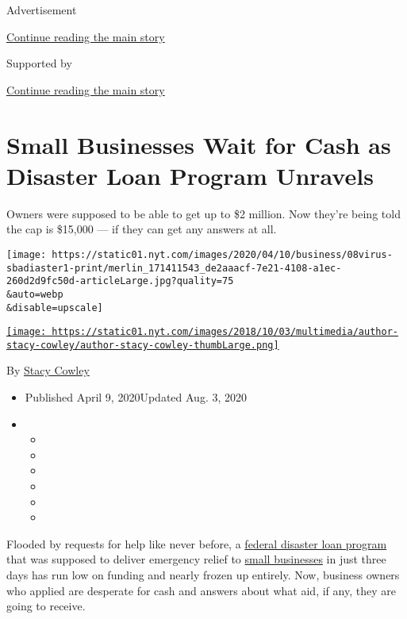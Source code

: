 Advertisement

\protect\hyperlink{after-top}{Continue reading the main story}

Supported by

\protect\hyperlink{after-sponsor}{Continue reading the main story}

\hypertarget{small-businesses-wait-for-cash-as-disaster-loan-program-unravels}{%
\section{Small Businesses Wait for Cash as Disaster Loan Program
Unravels}\label{small-businesses-wait-for-cash-as-disaster-loan-program-unravels}}

Owners were supposed to be able to get up to \$2 million. Now they're
being told the cap is \$15,000 --- if they can get any answers at all.

\texttt{[image: https://static01.nyt.com/images/2020/04/10/business/08virus-sbadiaster1-print/merlin\_171411543\_de2aaacf-7e21-4108-a1ec-260d2d9fc50d-articleLarge.jpg?quality=75\\\&auto=webp\\\&disable=upscale]}

\href{https://www.nytimes.com/by/stacy-cowley}{\texttt{[image: https://static01.nyt.com/images/2018/10/03/multimedia/author-stacy-cowley/author-stacy-cowley-thumbLarge.png]}}

By \href{https://www.nytimes.com/by/stacy-cowley}{Stacy Cowley}

\begin{itemize}
\item
  Published April 9, 2020Updated Aug. 3, 2020
\item
  \begin{itemize}
  \item
  \item
  \item
  \item
  \item
  \item
  \end{itemize}
\end{itemize}

Flooded by requests for help like never before, a
\href{https://www.nytimes.com/2020/08/03/business/small-business-loans-coronavirus.html}{federal
disaster loan program} that was supposed to deliver emergency relief to
\href{https://www.nytimes.com/2020/04/20/business/shake-shack-returning-loan-ppp-coronavirus.html}{small
businesses} in just three days has run low on funding and nearly frozen
up entirely. Now, business owners who applied are desperate for cash and
answers about what aid, if any, they are going to receive.

